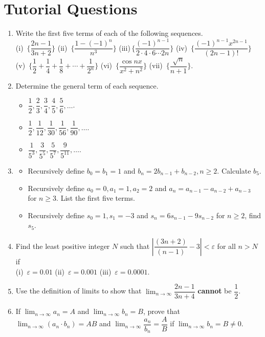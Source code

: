 \documentclass[titlepage,a4paper,12pt]{report}
\begin{document}
 \section{Tutorial Questions}
 \begin{enumerate}
\item Write the first five terms of each of the following sequences.\\
(i)\, $\Biggl \{\dfrac{2n-1}{3n+2}\Biggr \}$ \quad (ii)\, $\Biggl\{\dfrac{1-(-1)^n}{n^3}\Biggr\}$ \quad (iii)\,$\Biggl \{\dfrac{(-1)^{n-1}}{2\cdot 4 \cdot 6 \cdots 2n}\Biggr\}$  \quad (iv)\, $\Biggl \{\dfrac{(-1)^{n-1}x^{2n-1}}{(2n-1)!}\Biggr \}$ \\ (v)\, $\Biggl \{\dfrac{1}{2} +\dfrac{1}{4}+\dfrac{1}{8}+\cdots +\dfrac{1}{2^n}\Biggr\}$ \quad (vi)\, $\Biggl \{\dfrac{\cos nx}{x^2+n^2}\Biggr \}$ \quad (vii)\, $\Biggl \{\dfrac{\sqrt{n}}{n+1}\Biggr \}$.
\item Determine the general term of each sequence.
\begin{itemize}
\item[(i)] $\dfrac{1}{2}, \dfrac{2}{3}, \dfrac{3}{4}, \dfrac{4}{5}, \dfrac{5}{6}, \dots$. 
\item[(ii)] $\dfrac{1}{2}, \dfrac{1}{12}, \dfrac{1}{30}, \dfrac{1}{56}, \dfrac{1}{90}, \dots$.
\item[(iii)] $\dfrac{1}{5^3}, \dfrac{3}{5^5}, \dfrac{5}{5^7}, \dfrac{9}{5^{11}}, \dots$.
\end{itemize}
\item \begin{itemize}
\item[(i)] Recursively define $b_0=b_1=1$ and $b_n=2b_{n-1}+b_{n-2}, n\geq 2$. Calculate $b_5$.
\item[(ii)] Recursively define $a_0=0, a_1=1, a_2=2$ and $a_n=a_{n-1}-a_{n-2}+a_{n-3}$ for $n\geq 3$. List the first five terms.
\item[(iii)] Recursively define $s_0=1, s_1=-3$ and $s_n=6s_{n-1}-9s_{n-2}$ for $n \geq 2$, find $s_5$.
\end{itemize}
\item Find the least positive integer $N$ such that $\left|\dfrac{(3n+2)}{(n-1)}-3\right|<\varepsilon$ for all $n>N$ if \\
(i)\, $\varepsilon =0.01$ \quad (ii)\, $\varepsilon =0.001$ \quad (iii)\, $\varepsilon = 0.0001$.
\item Use the definition of limits to show that $\displaystyle \lim _{n\rightarrow \infty}\dfrac{2n-1}{3n+4}$ \textbf{cannot} be $\dfrac{1}{2}$.
\item If $\displaystyle \lim _{n\rightarrow \infty} a_n =A$ and $\displaystyle \lim _{n\rightarrow \infty} b_n=B$, prove that  $\displaystyle \lim _{n\rightarrow \infty}(a_n \cdot b_n)=AB$ and  $\displaystyle \lim _{n\rightarrow \infty}\dfrac{a_n}{b_n}=\dfrac{A}{B}$ if $\displaystyle \lim _{n\rightarrow \infty} b_n =B \neq 0$.

\end{enumerate}
\end{document}
